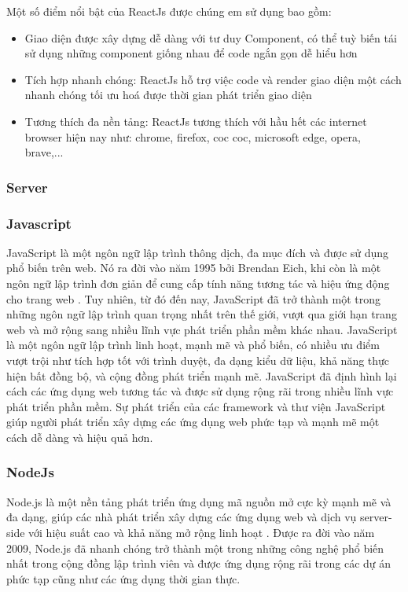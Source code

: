 Một số điểm nổi bật của ReactJs được chúng em sử dụng bao gồm:


\begin{itemize}
  \item Giao diện được xây dựng dễ dàng với tư duy Component, có thể tuỳ biến tái sử dụng những component giống nhau để code ngắn gọn dễ hiểu hơn
  \item Tích hợp nhanh chóng: ReactJs hỗ trợ việc code và render giao diện một cách nhanh chóng tối ưu hoá được thời gian phát triển giao diện
  \item Tương thích đa nền tảng: ReactJs tương thích với hầu hết các internet browser hiện nay như: chrome, firefox, coc coc, microsoft edge, opera, brave,...
\end{itemize}

\subsubsection{Server}
\subsubsection{Javascript}
\mbox{}

JavaScript là một ngôn ngữ lập trình thông dịch, đa mục đích và được sử dụng phổ biến trên web. Nó ra đời vào năm 1995 bởi Brendan Eich, khi còn là một ngôn ngữ lập trình đơn giản để cung cấp tính năng tương tác và hiệu ứng động cho trang web \cite{js_1}. Tuy nhiên, từ đó đến nay, JavaScript đã trở thành một trong những ngôn ngữ lập trình quan trọng nhất trên thế giới, vượt qua giới hạn trang web và mở rộng sang nhiều lĩnh vực phát triển phần mềm khác nhau.
JavaScript là một ngôn ngữ lập trình linh hoạt, mạnh mẽ và phổ biến, có nhiều ưu điểm vượt trội như tích hợp tốt với trình duyệt, đa dạng kiểu dữ liệu, khả năng thực hiện bất đồng bộ, và cộng đồng phát triển mạnh mẽ. JavaScript đã định hình lại cách các ứng dụng web tương tác và được sử dụng rộng rãi trong nhiều lĩnh vực phát triển phần mềm. Sự phát triển của các framework và thư viện JavaScript giúp người phát triển xây dựng các ứng dụng web phức tạp và mạnh mẽ một cách dễ dàng và hiệu quả hơn.




\subsubsection{NodeJs}
\mbox{}

Node.js là một nền tảng phát triển ứng dụng mã nguồn mở cực kỳ mạnh mẽ và đa dạng, giúp các nhà phát triển xây dựng các ứng dụng web và dịch vụ server-side với hiệu suất cao và khả năng mở rộng linh hoạt \cite{nodejs_1}. Được ra đời vào năm 2009, Node.js đã nhanh chóng trở thành một trong những công nghệ phổ biến nhất trong cộng đồng lập trình viên và được ứng dụng rộng rãi trong các dự án phức tạp cũng như các ứng dụng thời gian thực. 

